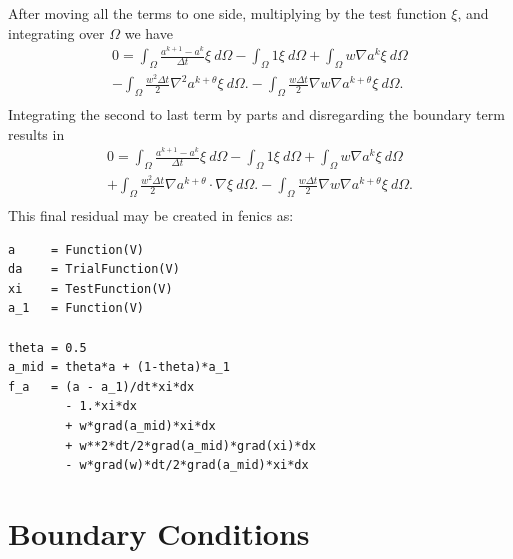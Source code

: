 \documentclass{article}%
\begin{document}
After moving all the terms to one side, multiplying by the test function $\xi$, and integrating over $\Omega$ we have
\begin{align*}
  0 = \int_{\Omega} \frac{a^{k+1} - a^{k}}{\Delta t}\xi\ d\Omega - 
      \int_{\Omega} 1\xi\ d\Omega
  + \int_{\Omega} w \nabla{a}^k \xi\ d\Omega \\
  - \int_{\Omega} \frac{w^2 \Delta t}{2} 
    \nabla^2 a^{k+\theta} \xi\ d\Omega.
  - \int_{\Omega} \frac{w \Delta t}{2} 
    \nabla w \nabla a^{k+\theta} \xi\ d\Omega. \\
\end{align*}
Integrating the second to last term by parts and disregarding the boundary term results in
\begin{align*}
  0 = \int_{\Omega} \frac{a^{k+1} - a^{k}}{\Delta t}\xi\ d\Omega - 
      \int_{\Omega} 1\xi\ d\Omega
  + \int_{\Omega} w \nabla{a}^k \xi\ d\Omega \\
  + \int_{\Omega} \frac{w^2 \Delta t}{2} 
    \nabla a^{k+\theta} \cdot \nabla \xi\ d\Omega.
  - \int_{\Omega} \frac{w \Delta t}{2} 
    \nabla w \nabla a^{k+\theta} \xi\ d\Omega.\\
\end{align*}
This final residual may be created in fenics as:

\footnotesize
\begin{verbatim}
a     = Function(V)
da    = TrialFunction(V)
xi    = TestFunction(V)
a_1   = Function(V)

theta = 0.5
a_mid = theta*a + (1-theta)*a_1
f_a   = (a - a_1)/dt*xi*dx 
        - 1.*xi*dx 
        + w*grad(a_mid)*xi*dx 
        + w**2*dt/2*grad(a_mid)*grad(xi)*dx 
        - w*grad(w)*dt/2*grad(a_mid)*xi*dx
\end{verbatim}
\normalsize


\section{Boundary Conditions}
\end{document}
